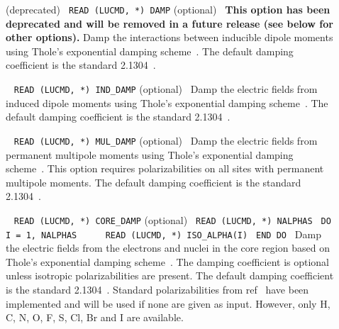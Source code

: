 \begin{description}
\item[] (deprecated)\verb| |\newline
\verb|READ (LUCMD, *) DAMP| (optional)\verb| |\newline
\textbf{This option has been deprecated and will be removed in a future release (see below for other options).} Damp the interactions between inducible dipole moments using Thole's exponential damping scheme~\cite{thole_damp_1,thole_damp_2}. The default damping coefficient is the standard 2.1304~\cite{thole_damp_2}.

\item[]\verb| |\newline
\verb|READ (LUCMD, *) IND_DAMP| (optional)\verb| |\newline
Damp the electric fields from induced dipole moments using Thole's exponential damping scheme~\cite{thole_damp_1,thole_damp_2}. The default damping coefficient is the standard 2.1304~\cite{thole_damp_2}.

\item[]\verb| |\newline
\verb|READ (LUCMD, *) MUL_DAMP| (optional)\verb| |\newline
Damp the electric fields from permanent multipole moments using Thole's exponential damping scheme~\cite{thole_damp_1,thole_damp_2}. This option requires polarizabilities on all sites with permanent multipole moments. The default damping coefficient is the standard 2.1304~\cite{thole_damp_2}.

\item[]\verb| |\newline
\verb|READ (LUCMD, *) CORE_DAMP| (optional)\verb| |\newline
\verb|READ (LUCMD, *) NALPHAS|\verb| |\newline
\verb|DO I = 1, NALPHAS|\verb| |\newline
\verb|    READ (LUCMD, *) ISO_ALPHA(I)|\verb| |\newline
\verb|END DO|\verb| |\newline
Damp the electric fields from the electrons and nuclei in the core region based on Thole's exponential damping scheme~\cite{thole_damp_1,thole_damp_2}. The damping coefficient is optional unless isotropic polarizabilities are present. The default damping coefficient is the standard 2.1304~\cite{thole_damp_2}. Standard polarizabilities from ref~ have been implemented and will be used if none are given as input. However, only H, C, N, O, F, S, Cl, Br and I are available.


\end{description}
